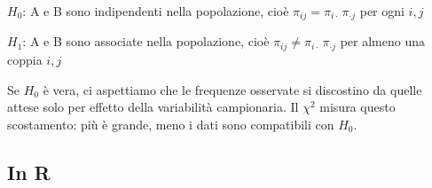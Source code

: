 \documentclass[
  ignorenonframetext,
  compress, aspectratio=149]{beamer}
\begin{document}
\begin{frame}{}
\label{section-2}
\begin{tcolorbox}[enhanced jigsaw, opacitybacktitle=0.6, colframe=quarto-callout-note-color-frame, arc=.35mm, colbacktitle=quarto-callout-note-color!10!white, titlerule=0mm, breakable, colback=white, opacityback=0, coltitle=black, leftrule=.75mm, bottomtitle=1mm, toptitle=1mm, title={Sistema di ipotesi}, bottomrule=.15mm, rightrule=.15mm, toprule=.15mm, left=2mm]

\(H_0\): A e B sono indipendenti nella popolazione, cioè
\(\pi_{ij} = \pi_{i\cdot}\,\pi_{\cdot j}\) per ogni \(i, j\)

\(H_1\): A e B sono associate nella popolazione, cioè
\(\pi_{ij} \neq \pi_{i\cdot}\,\pi_{\cdot j}\) per almeno una coppia
\(i, j\)

\end{tcolorbox}

Se \(H_0\) è vera, ci aspettiamo che le frequenze osservate si
discostino da quelle attese solo per effetto della variabilità
campionaria. Il \(\chi^2\) misura questo scostamento: più è grande, meno
i dati sono compatibili con \(H_0\).
\end{frame}

\subsection{In R}\label{in-r}
\end{document}

